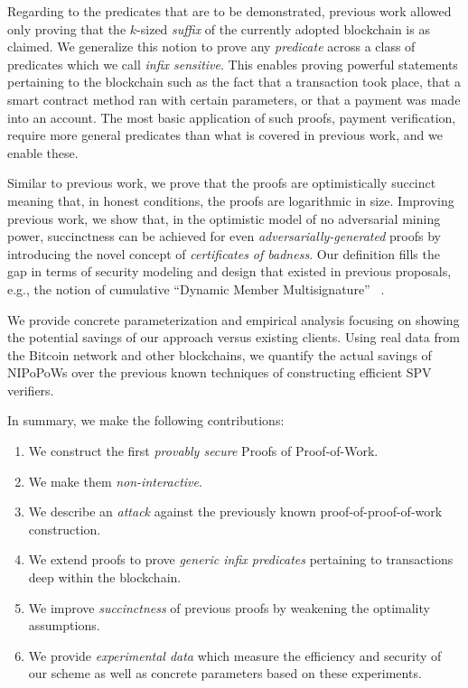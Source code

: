 Regarding to the predicates that are to be demonstrated, 
 previous work allowed only proving that the $k$-sized \emph{suffix} of the
currently adopted blockchain is as claimed. We generalize this notion to prove
any \emph{predicate} across a class of predicates which we call \emph{infix
sensitive}. This enables proving powerful statements pertaining to the
blockchain such as the fact that a transaction took place, that a smart contract
method ran with certain parameters, or that a payment was made into an account.
The most basic application of such proofs, payment verification, require more
general predicates than what is covered in previous work, and we enable these.

Similar to previous work, we prove that the proofs are optimistically
succinct meaning that, in honest conditions, the proofs are logarithmic in size.
Improving previous work, we show that, in the optimistic model of no adversarial
mining power, succinctness can be achieved for even
\textit{adversarially-generated} proofs by introducing the novel concept of
\textit{certificates of badness}. Our definition fills the gap in terms of
security modeling and design that existed in previous proposals, e.g., the
notion of cumulative ``Dynamic Member Multisignature'' ~\cite{sidechains}.

We provide concrete parameterization and empirical analysis focusing on showing
the potential savings of our approach versus existing clients. Using real data
from the Bitcoin network and other blockchains, we quantify the actual savings of
NIPoPoWs over the previous known techniques of constructing efficient SPV
verifiers.

In summary, we make the following contributions:
\begin{enumerate}
  \item We construct the first \emph{provably secure} Proofs of Proof-of-Work.
  \item We make them \emph{non-interactive}.
  \item We describe an \emph{attack} against the previously known proof-of-proof-of-work construction.
  \item We extend proofs to prove \emph{generic infix predicates} pertaining to
        transactions deep within the blockchain.
  \item We improve \emph{succinctness} of previous proofs by weakening the
        optimality assumptions.
  \item We provide \emph{experimental data} which measure the efficiency and
        security of our scheme as well as concrete parameters based on these
        experiments.
\end{enumerate}
